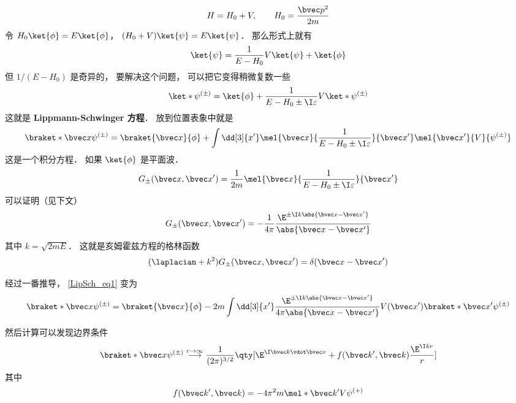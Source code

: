 

\begin{equation}
H = H_0 + V, \qquad H_0 = \frac{\bvec p^2}{2m}
\end{equation}
令 $H_0\ket{\phi} = E\ket{\phi}$， $(H_0+V)\ket{\psi}=E\ket{\psi}$． 那么形式上就有
\begin{equation}
\ket{\psi} = \frac{1}{E-H_0} V\ket{\psi} + \ket{\phi}
\end{equation}
但 $1/(E-H_0)$ 是奇异的， 要解决这个问题， 可以把它变得稍微复数一些
\begin{equation}
\ket*{\psi^{(\pm)}} = \ket{\phi} + \frac{1}{E-H_0\pm \I\varepsilon} V \ket*{\psi^{(\pm)}}
\end{equation}
这就是 \textbf{Lippmann-Schwinger 方程}． 放到位置表象中就是
\begin{equation}\label{LipSch_eq1}
\braket*{\bvec x}{\psi^{(\pm)}} = \braket{\bvec x}{\phi} + \int \dd[3]{x'} \mel{\bvec x}{\frac{1}{E-H_0\pm \I\varepsilon}}{\bvec x'} \mel{\bvec x'}{V}{\psi^{(\pm)}}
\end{equation}
这是一个积分方程． 如果 $\ket{\phi}$ 是平面波．
\begin{equation}\label{LipSch_eq2}
G_\pm (\bvec x, \bvec x') = \frac{1}{2m} \mel{\bvec x}{\frac{1}{E-H_0\pm \I\varepsilon}}{\bvec x'}
\end{equation}
可以证明（见下文）
\begin{equation}\label{LipSch_eq3}
G_\pm (\bvec x, \bvec x') = -\frac{1}{4\pi} \frac{\E^{\pm\I k\abs{\bvec x-\bvec x'}}}{\abs{\bvec x-\bvec x'}}
\end{equation}
其中 $k = \sqrt{2mE}$． 这就是亥姆霍兹方程的格林函数
\begin{equation}
(\laplacian +k^2)G_\pm (\bvec x, \bvec x') = \delta(\bvec x-\bvec x')
\end{equation}

经过一番推导， \autoref{LipSch_eq1} 变为
\begin{equation}
\braket*{\bvec x}{\psi^{(\pm)}} = \braket{\bvec x}{\phi} - 2m\int \dd[3]{x'} \frac{\E^{\pm\I k\abs{\bvec x-\bvec x'}}}{4\pi\abs{\bvec x-\bvec x'}} V(\bvec x')\braket*{\bvec x'}{\psi^{(\pm)}}
\end{equation}

然后计算可以发现边界条件
\begin{equation}
\braket*{\bvec x}{\psi^{(\pm)}} \overset{r\to\infty}{\longrightarrow} \frac{1}{(2\pi)^{3/2}} \qty[\E^{\I \bvec k\vdot \bvec x} + f(\bvec k', \bvec k)\frac{\E^{\I kr}}{r}]
\end{equation}
其中
\begin{equation}
f(\bvec k', \bvec k) = -4\pi^2 m \mel*{\bvec k'}{V}{\psi^{(+)}}
\end{equation}

